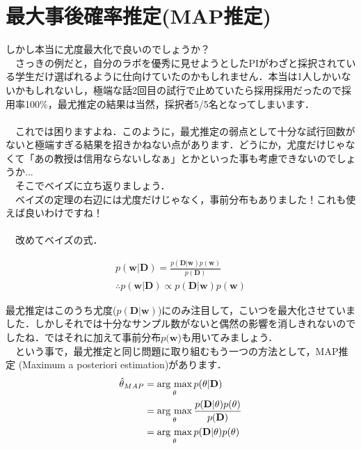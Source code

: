 \documentclass[11pt,a4paper,uplatex]{ujreport} 	%
\newcommand{\argmax}{\mathop{\rm arg~max}\limits}
\begin{document}
\section{最大事後確率推定(MAP推定)}
しかし本当に尤度最大化で良いのでしょうか？\\
　さっきの例だと，自分のラボを優秀に見せようとしたPIがわざと採択されている学生だけ選ばれるように仕向けていたのかもしれません．本当は1人しかいないかもしれないし，極端な話2回目の試行で止めていたら採用採用だったので採用率100\%，最尤推定の結果は当然，採択者5/5名となってしまいます．\\
\\
　これでは困りますよね．このように，最尤推定の弱点として十分な試行回数がないと極端すぎる結果を招きかねない点があります．どうにか，尤度だけじゃなくて「あの教授は信用ならないしなぁ」とかといった事も考慮できないのでしょうか...\\
　そこでベイズに立ち返りましょう．\\
　ベイズの定理の右辺には尤度だけじゃなく，事前分布もありました！これも使えば良いわけですね！\\
\\
　改めてベイズの式．

\begin{align}
p(\mathbf{w}|\mathbf{D}) = \frac{p(\mathbf{D}|\mathbf{w})p(\mathbf{w})}{p(\mathbf{D})} \\
\therefore p(\mathbf{w}|\mathbf{D}) \propto p(\mathbf{D}|\mathbf{w})p(\mathbf{w})
\end{align}


最尤推定はこのうち尤度($p(\mathbf{D}|\mathbf{w})$)にのみ注目して，こいつを最大化させていました．しかしそれでは十分なサンプル数がないと偶然の影響を消しきれないのでしたね．ではそれに加えて事前分布$p(\mathbf{w}$)も用いてみましょう．\\
　という事で，最尤推定と同じ問題に取り組むもう一つの方法として，MAP推定 (Maximum a posteriori estimation)があります．\\

\begin{align}
\hat \theta_{MAP} &=\argmax_\theta p(\theta|\mathbf{D})\\
& = \argmax_\theta \frac{p(\mathbf{D}|\theta)p(\theta)}{p(\mathbf{D})}\\
&= \argmax_\theta p(\mathbf{D}|\theta)p(\theta)
\end{align}
\end{document}
